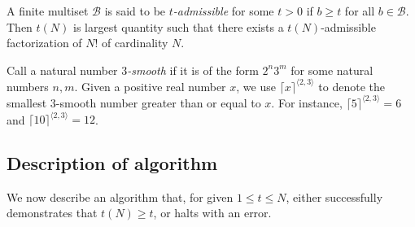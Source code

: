 \documentclass[12pt,a4paper,reqno]{amsart}
\numberwithin{equation}{section}
\theoremstyle{plain}
\theoremstyle{definition}
\newcommand\tuple{{\mathcal B}}
\begin{document}
A finite multiset $\tuple$ is said to be \emph{$t$-admissible} for some $t>0$ if $b \geq t$ for all $b \in \tuple$.  Then $t(N)$ is largest quantity such that there exists a $t(N)$-admissible factorization of $N!$ of cardinality $N$.  

Call a natural number \emph{$3$-smooth} if it is of the form $2^n 3^m$ for some natural numbers $n,m$.  Given a positive real number $x$, we use $\lceil x \rceil^{\langle 2,3 \rangle}$ to denote the smallest $3$-smooth number greater than or equal to $x$.  For instance, $\lceil 5 \rceil^{\langle 2,3 \rangle} = 6$ and $\lceil 10 \rceil^{\langle 2,3 \rangle} = 12$.

\subsection{Description of algorithm}

We now describe an algorithm that, for given $1 \leq t \leq N$, either successfully demonstrates that $t(N) \geq t$, or halts with an error.
\end{document}
